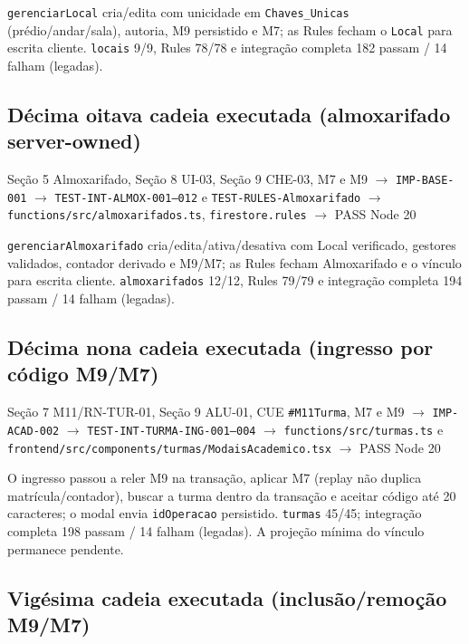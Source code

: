 \texttt{gerenciarLocal} cria/edita com unicidade em \texttt{Chaves\_Unicas}
(prédio/andar/sala), autoria, M9 persistido e M7; as Rules fecham o \texttt{Local}
para escrita cliente. \texttt{locais} 9/9, Rules 78/78 e integração completa 182
passam / 14 falham (legadas).

\subsection{Décima oitava cadeia executada (almoxarifado server-owned)}

\begin{center}
Seção 5 Almoxarifado, Seção 8 UI-03, Seção 9 CHE-03, M7 e M9
$\rightarrow$ \texttt{IMP-BASE-001}
$\rightarrow$ \texttt{TEST-INT-ALMOX-001--012} e \texttt{TEST-RULES-Almoxarifado}
$\rightarrow$ \nolinkurl{functions/src/almoxarifados.ts}, \nolinkurl{firestore.rules}
$\rightarrow$ PASS Node 20
\end{center}

\texttt{gerenciarAlmoxarifado} cria/edita/ativa/desativa com Local verificado,
gestores validados, contador derivado e M9/M7; as Rules fecham Almoxarifado e o
vínculo para escrita cliente. \texttt{almoxarifados} 12/12, Rules 79/79 e
integração completa 194 passam / 14 falham (legadas).

\subsection{Décima nona cadeia executada (ingresso por código M9/M7)}

\begin{center}
Seção 7 M11/RN-TUR-01, Seção 9 ALU-01, CUE \texttt{\#M11Turma}, M7 e M9
$\rightarrow$ \texttt{IMP-ACAD-002}
$\rightarrow$ \texttt{TEST-INT-TURMA-ING-001--004}
$\rightarrow$ \nolinkurl{functions/src/turmas.ts} e \nolinkurl{frontend/src/components/turmas/ModaisAcademico.tsx}
$\rightarrow$ PASS Node 20
\end{center}

O ingresso passou a reler M9 na transação, aplicar M7 (replay não duplica
matrícula/contador), buscar a turma dentro da transação e aceitar código até 20
caracteres; o modal envia \texttt{idOperacao} persistido. \texttt{turmas} 45/45;
integração completa 198 passam / 14 falham (legadas). A projeção mínima do
vínculo permanece pendente.

\subsection{Vigésima cadeia executada (inclusão/remoção M9/M7)}

